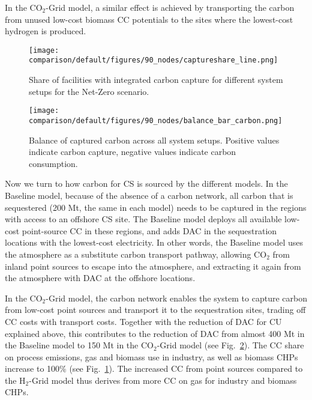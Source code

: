 \documentclass[twocolumn]{article}
\newcommand{\CO}{CO$_2$}
\newcommand{\modBase}{Baseline model}
\newcommand{\modCO}{CO$_2$-Grid model}
\newcommand{\modH}{H$_2$-Grid model}
\begin{document}
In the \modCO{}, a similar effect is achieved by transporting the carbon from unused low-cost biomass CC potentials to the sites where the lowest-cost hydrogen is produced.

\begin{figure}[h]
    \centering
    \texttt{[image: comparison/default/figures/90\_nodes/captureshare\_line.png]}
    \caption{Share of facilities with integrated carbon capture for different system setups for the Net-Zero scenario.}
    \label{fig:captureshare_line}
\end{figure}%

\begin{figure}[ht!]
    \centering
    \texttt{[image: comparison/default/figures/90\_nodes/balance\_bar\_carbon.png]}
    \caption{Balance of captured carbon across all system setups. Positive values indicate carbon capture, negative values indicate carbon consumption.}
    \label{fig:balance_captured_carbon}
\end{figure}

Now we turn to how carbon for CS is sourced by the different models. In the \modBase{}, because of the absence of a carbon network, all carbon that is sequestered (200 Mt, the same in each model) needs to be captured in the regions with access to an offshore CS site. The \modBase{} deploys all available low-cost point-source CC in these regions, and adds DAC in the sequestration locations with the lowest-cost electricity. In other words, the \modBase{} uses the atmosphere as a substitute carbon transport pathway, allowing \CO{} from inland point sources to escape into the atmosphere, and extracting it again from the atmosphere with DAC at the offshore locations.

In the \modCO{}, the carbon network enables the system to capture carbon from low-cost point sources and transport it to the sequestration sites, trading off CC costs with transport costs. Together with the reduction of DAC for CU explained above, this contributes to the reduction of DAC from almost \label{}400 Mt in the Baseline model to \label{}150 Mt in the \modCO{} (see Fig.~\ref{fig:balance_captured_carbon}). The CC share on process emissions, gas and biomass use in industry, as well as biomass CHPs increase to 100\% (see Fig.~\ref{fig:captureshare_line}). The increased CC from point sources compared to the \modH{} thus derives from more CC on gas for industry and biomass CHPs.
\end{document}
